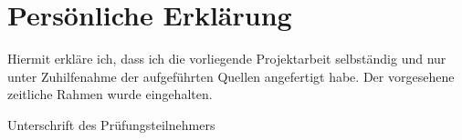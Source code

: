 \clearpage
\section*{Persönliche Erklärung}

Hiermit erkläre ich, dass ich die vorliegende Projektarbeit selbständig und
nur unter Zuhilfenahme der aufgeführten Quellen angefertigt habe. Der
vorgesehene zeitliche Rahmen wurde eingehalten.

\vspace{3cm}
\noindent\makebox[0.65\textwidth]{\hrulefill}

\noindent Unterschrift des Prüfungsteilnehmers
